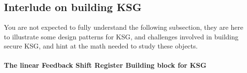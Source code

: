 \subsection{Interlude on building KSG}
\begin{framedremark}
You are not expected to fully understand the following subsection, they are here to illustrate some design patterns for KSG, and challenges involved in building secure KSG, and hint at the math needed to study these objects.
\end{framedremark}
\paragraph{The linear Feedback Shift Register Building block for KSG}%
\label{par:The linear Feedback Shift Register Building block for KSG}


